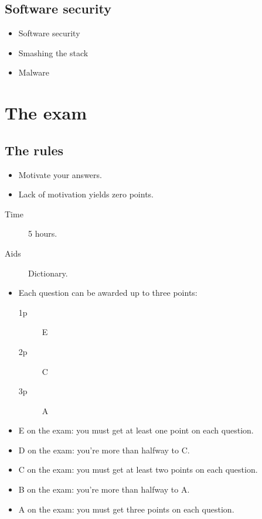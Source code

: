 \subsection{Software security}

\begin{frame}
  \begin{itemize}
    \item Software security
    \item Smashing the stack
    \item Malware
  \end{itemize}
\end{frame}


\section{The exam}

\subsection{The rules}

\begin{frame}
  \begin{itemize}
    \item Motivate your answers.
    \item Lack of motivation yields zero points.
  \end{itemize}
\end{frame}

\begin{frame}
  \begin{description}
    \item[Time] 5 hours.
    \item[Aids] Dictionary.
  \end{description}
\end{frame}

\begin{frame}
  \begin{itemize}
    \item Each question can be awarded up to three points:
      \begin{description}
        \item[1p] E
        \item[2p] C
        \item[3p] A
      \end{description}
    \item E on the exam: you must get at least one point on each question.
    \item D on the exam: you're more than halfway to C.
    \item C on the exam: you must get at least two points on each question.
    \item B on the exam: you're more than halfway to A.
    \item A on the exam: you must get three points on each question.
  \end{itemize}
\end{frame}

